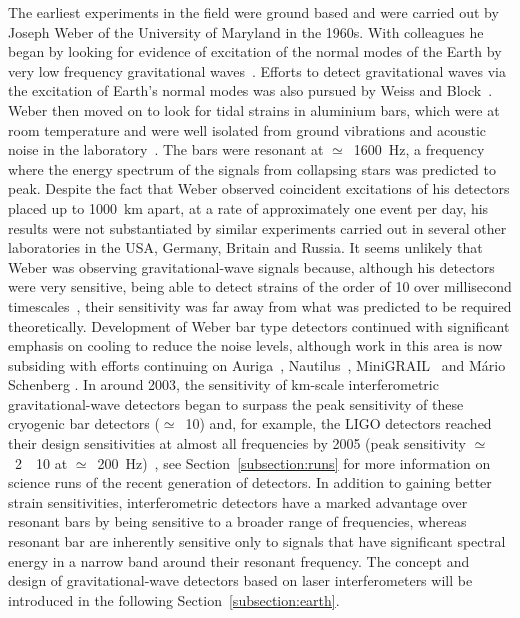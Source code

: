 \documentclass{article}
\begin{document}
The earliest experiments in the field were ground based and were carried out by
Joseph Weber of the University of Maryland in the 1960s. With colleagues he
began by looking for evidence of excitation of the normal modes of the Earth by
very low frequency gravitational waves~\cite{Forward2}. Efforts to detect gravitational
waves via the excitation of Earth's normal modes was also pursued by Weiss and Block~\cite{Weiss:1965}.
Weber then moved on to look for tidal strains in aluminium bars, which were at room temperature and were
well isolated from ground vibrations and acoustic noise in the
laboratory~\cite{Weber1, Weber2}. The bars were resonant at $\simeq$~1600~Hz, a
frequency where the energy spectrum of the signals from collapsing stars was
predicted to peak. Despite the fact that Weber observed coincident excitations
of his detectors placed up to 1000~km apart, at a rate of approximately one
event per day, his results were not substantiated by similar experiments carried
out in several other laboratories in the USA, Germany, Britain and Russia. It
seems unlikely that Weber was observing gravitational-wave signals because,
although his detectors were very sensitive, being able to detect strains of the
order of 10 over millisecond timescales~\cite{Weber1}, their sensitivity
was far away from what was predicted to be required theoretically. Development
of Weber bar type detectors continued with significant emphasis on cooling to
reduce the noise levels, although work in this area is now subsiding with
efforts continuing on Auriga~\cite{AURIGA}, Nautilus~\cite{NAUTILUS},
MiniGRAIL~\cite{MiniGRAIL, Gottardi:2007} and M\'{a}rio Schenberg
\cite{Schenberg, Aguiar:2006}.  In around 2003, the sensitivity of km-scale
interferometric gravitational-wave detectors began to surpass the peak
sensitivity of these cryogenic bar detectors ($\simeq$~10)
and, for example, the LIGO detectors reached their design sensitivities at
almost all frequencies by 2005 (peak sensitivity
$\simeq$~2~\texttimes~10 at
$\simeq$~200~Hz)~\cite{Whitcomb:2008}, see
Section~\ref{subsection:runs} for more information on science runs of
the recent generation of detectors.  In addition to gaining better
strain sensitivities, interferometric detectors have a marked
advantage over resonant bars by being sensitive to a broader range of
frequencies, whereas resonant bar are inherently sensitive only to
signals that have significant spectral energy in a narrow band around
their resonant frequency. The concept and design of gravitational-wave
detectors based on laser interferometers will be introduced in the
following Section~\ref{subsection:earth}. 
\end{document}
